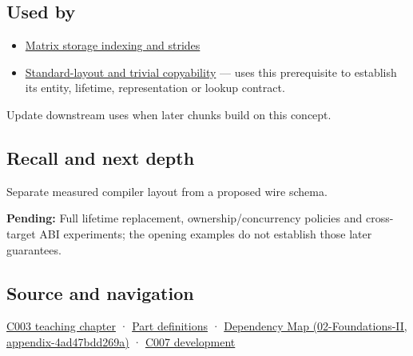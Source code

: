 \subsection{Used by}\label{appendix-c4ac6bb0fff8-used-by}

\begin{itemize}
\item
  \hyperref[appendix-ffdc1d4e5350]{Matrix storage indexing and strides}
\item
  \hyperref[appendix-958870a64c53]{Standard-layout and trivial copyability} --- uses this prerequisite to establish its entity, lifetime, representation or lookup contract.
\end{itemize}

Update downstream uses when later chunks build on this concept.

\subsection{Recall and next depth}\label{appendix-c4ac6bb0fff8-recall-and-next-depth}

Separate measured compiler layout from a proposed wire schema.

\textbf{Pending:} Full lifetime replacement, ownership/concurrency policies and cross-target ABI experiments; the opening examples do not establish those later guarantees.

\subsection{Source and navigation}\label{appendix-c4ac6bb0fff8-source-and-navigation}

\hyperref[01-foundations-i-ch002-where-the-bytes-live]{C003 teaching chapter} · \hyperref[appendix-fd090d982a15-m003---parts-41-60]{Part definitions} · \href{../02-Foundations-II/main.pdf\#nameddest=appendix-4ad47bdd269a}{Dependency Map (02-Foundations-II, appendix-4ad47bdd269a)} · \hyperref[01-foundations-i-ch003-bringing-the-object-model-back-to-bytes]{C007 development}
